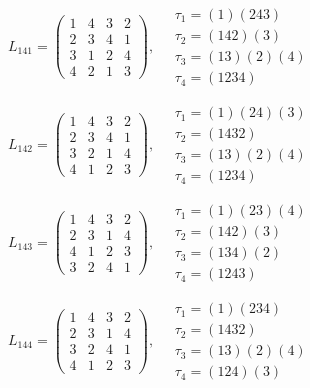 $L_{141} = \begin{pmatrix} 1 & 4 & 3 & 2 \\ 2 & 3 & 4 & 1 \\ 3 & 1 & 2 & 4 \\ 4 & 2 & 1 & 3 \end{pmatrix}, \quad \begin{matrix} \tau_{1} = (1)(2 4 3) \\ \tau_{2} = (1 4 2)(3) \\ \tau_{3} = (1 3)(2)(4) \\ \tau_{4} = (1 2 3 4) \end{matrix}$

$L_{142} = \begin{pmatrix} 1 & 4 & 3 & 2 \\ 2 & 3 & 4 & 1 \\ 3 & 2 & 1 & 4 \\ 4 & 1 & 2 & 3 \end{pmatrix}, \quad \begin{matrix} \tau_{1} = (1)(2 4)(3) \\ \tau_{2} = (1 4 3 2) \\ \tau_{3} = (1 3)(2)(4) \\ \tau_{4} = (1 2 3 4) \end{matrix}$

$L_{143} = \begin{pmatrix} 1 & 4 & 3 & 2 \\ 2 & 3 & 1 & 4 \\ 4 & 1 & 2 & 3 \\ 3 & 2 & 4 & 1 \end{pmatrix}, \quad \begin{matrix} \tau_{1} = (1)(2 3)(4) \\ \tau_{2} = (1 4 2)(3) \\ \tau_{3} = (1 3 4)(2) \\ \tau_{4} = (1 2 4 3) \end{matrix}$

$L_{144} = \begin{pmatrix} 1 & 4 & 3 & 2 \\ 2 & 3 & 1 & 4 \\ 3 & 2 & 4 & 1 \\ 4 & 1 & 2 & 3 \end{pmatrix}, \quad \begin{matrix} \tau_{1} = (1)(2 3 4) \\ \tau_{2} = (1 4 3 2) \\ \tau_{3} = (1 3)(2)(4) \\ \tau_{4} = (1 2 4)(3) \end{matrix}$

